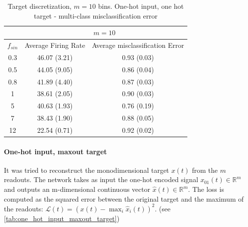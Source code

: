 \documentclass[10pt,a4paper, final]{report} %
\begin{document}
\begin{table}[H]
\centering
\begin{tabular}{c|c|c|}
\cline{2-3}
                          & \multicolumn{2}{|c|}{$m= 10$}            \\ \hline
\multicolumn{1}{|c|}{$f_{sin}$} & Average Firing Rate & Average misclassification Error     \\ \hline
\multicolumn{1}{|c|}{0.3} & 46.07 (3.21)  & 0.93 (0.03) \\
\multicolumn{1}{|c|}{0.5} & 44.05 (9.05)  & 0.86 (0.04) \\
\multicolumn{1}{|c|}{0.8} & 41.89 (4.40)  & 0.87 (0.03) \\
\multicolumn{1}{|c|}{1}   & 38.61 (2.05)  & 0.90 (0.03) \\
\multicolumn{1}{|c|}{5}   & 40.63 (1.93)  & 0.76 (0.19) \\
\multicolumn{1}{|c|}{7}   & 38.43 (1.90)  & 0.88 (0.05) \\
\multicolumn{1}{|c|}{12}  & 22.54 (0.71)  &  0.92 (0.02)\\ \hline
\end{tabular}
\caption{Target discretization, $m=10$ bins. One-hot input, one hot target - multi-class misclassification error}
\label{tab:one_hot_target_one_hot_output}
\end{table}

\paragraph{One-hot input, maxout target}
It was tried to reconstruct the monodimensional target $x(t)$ from the $m$ readouts.
The network takes as input the one-hot encoded signal $x_{01}(t) \in \mathbb{R}^m$ and outputs an m-dimensional continuous vector $\hat{x}(t) \in \mathbb{R}^m$. The loss is computed as the squared error between the original target and the maximum of the readouts: $\mathcal{L}(t) =  (x(t) - \max_i \hat{x}_i(t))^2$. (see \autoref{tab:one_hot_input_maxout_target})
\end{document}
